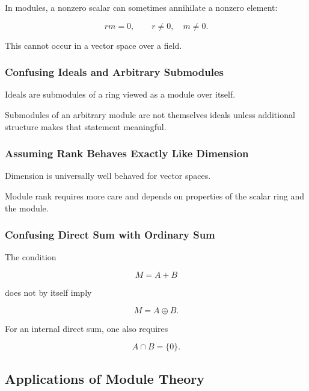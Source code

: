 In modules, a nonzero scalar can sometimes annihilate a nonzero element:

\[ rm=0,\qquad r\neq0,\quad m\neq0. \]

This cannot occur in a vector space over a field.

\subsubsection{Confusing Ideals and Arbitrary Submodules}

Ideals are submodules of a ring viewed as a module over itself.

Submodules of an arbitrary module are not themselves ideals unless additional
structure makes that statement meaningful.

\subsubsection{Assuming Rank Behaves Exactly Like Dimension}

Dimension is universally well behaved for vector spaces.

Module rank requires more care and depends on properties of the scalar ring
and the module.

\subsubsection{Confusing Direct Sum with Ordinary Sum}

The condition

\[ M=A+B \]

does not by itself imply

\[ M=A\oplus B. \]

For an internal direct sum, one also requires

\[ A\cap B=\{0\}. \]

\subsection{Applications of Module Theory}
\label{subsec:module-theory-applications}

